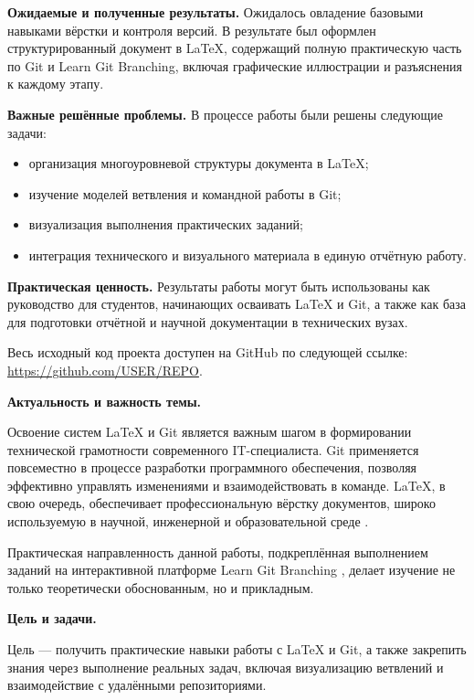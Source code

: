 \documentclass[a4paper,12pt]{report}
\newcommand{\github}{\url{https://github.com/USER/REPO}}
\begin{document}
\textbf{Ожидаемые и полученные результаты.}
Ожидалось овладение базовыми навыками вёрстки и контроля версий. В результате был оформлен структурированный документ в \LaTeX{}, содержащий полную практическую часть по Git и Learn Git Branching, включая графические иллюстрации и разъяснения к каждому этапу.

\textbf{Важные решённые проблемы.}
В процессе работы были решены следующие задачи:
\begin{itemize}
  \item организация многоуровневой структуры документа в \LaTeX{};
  \item изучение моделей ветвления и командной работы в Git;
  \item визуализация выполнения практических заданий;
  \item интеграция технического и визуального материала в единую отчётную работу.
\end{itemize}

\textbf{Практическая ценность.}
Результаты работы могут быть использованы как руководство для студентов, начинающих осваивать \LaTeX{} и Git, а также как база для подготовки отчётной и научной документации в технических вузах.

Весь исходный код проекта доступен на GitHub по следующей ссылке: \github.


\introChapter

\textbf{Актуальность и важность темы.}

Освоение систем \LaTeX{} и Git \cite{latex_official_doc, progit_book} является важным шагом в формировании технической грамотности современного IT-специалиста. Git применяется повсеместно в процессе разработки программного обеспечения, позволяя эффективно управлять изменениями и взаимодействовать в команде. \LaTeX{}, в свою очередь, обеспечивает профессиональную вёрстку документов, широко используемую в научной, инженерной и образовательной среде \cite{latex_project_site, overleaf_intro}.

Практическая направленность данной работы, подкреплённая выполнением заданий на интерактивной платформе Learn Git Branching \cite{learngitbranching}, делает изучение не только теоретически обоснованным, но и прикладным.

\textbf{Цель и задачи.}

Цель — получить практические навыки работы с \LaTeX{} и Git, а также закрепить знания через выполнение реальных задач, включая визуализацию ветвлений и взаимодействие с удалёнными репозиториями.
\end{document}
